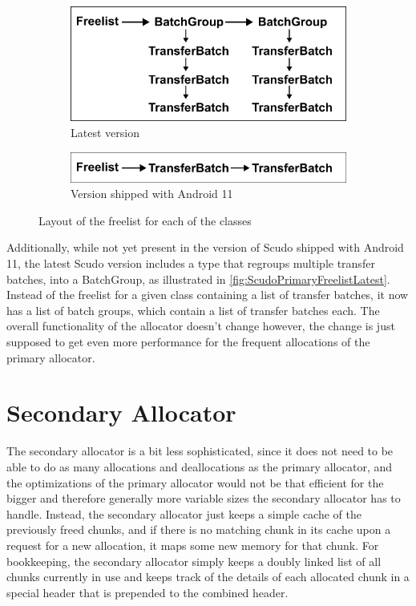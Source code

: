\documentclass[a4paper,11pt,oneside]{report}
\begin{document}
\begin{figure}[h!]
  \centering
  \begin{subfigure}{.5\textwidth}
    \centering
    \includegraphics[width=.9\linewidth]{figures/ScudoPrimaryFreelistLatest.png}
    \caption{Latest version}
    \label{fig:ScudoPrimaryFreelistLatest}
  \end{subfigure}%
  \begin{subfigure}{.5\textwidth}
    \centering
    \includegraphics[width=.9\linewidth]{figures/ScudoPrimaryFreelistAndroid.png}
    \caption{Version shipped with Android 11}
    \label{fig:ScudoPrimaryFreelistAndroid}
  \end{subfigure}
  \caption{Layout of the freelist for each of the classes}
  \label{fig:ScudoPrimaryFreelist}
\end{figure}

Additionally, while not yet present in the version of Scudo shipped with Android
11, the latest Scudo version includes a type that regroups multiple transfer
batches, into a BatchGroup, as illustrated in \autoref{fig:ScudoPrimaryFreelistLatest}.
Instead of the freelist for a given class containing
a list of transfer batches, it now has a list of batch groups, which contain
a list of transfer batches each. The overall functionality of the allocator
doesn't change however, the change is just supposed to get even more performance
for the frequent allocations of the primary allocator.

\section{Secondary Allocator}

The secondary allocator is a bit less sophisticated, since it does not need to
be able to do as many allocations and deallocations as the primary allocator,
and the optimizations of the primary allocator would not be that efficient for
the bigger and therefore generally more variable sizes the secondary allocator
has to handle. Instead, the secondary allocator just keeps a simple cache of
the previously freed chunks, and if there is no matching chunk in its cache
upon a request for a new allocation, it maps some new memory for that chunk.
For bookkeeping, the secondary allocator simply keeps a doubly linked list of
all chunks currently in use and keeps track of the details of each allocated
chunk in a special header that is prepended to the combined header.
\end{document}
